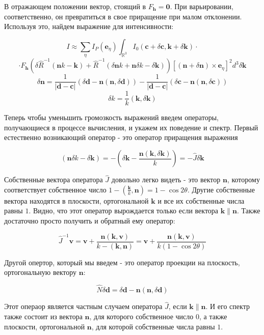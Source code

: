 \documentclass[12pt]{article}
\begin{document}
В отражающем положении вектор, стоящий в $F_{\pmb{h}} = \pmb{0}$. При варьировании,
соответственно, он превратиться в свое приращение при малом отклонении. Используя это,
найдем выражение для интенсивности:

\[ I \approx \sum_\eta I_P(\pmb{e}_\eta) \int_{\mathbb{R}^3}
I_0(\pmb{c} + \delta \pmb{c}, \pmb{k} + \delta \pmb{k}) \cdot\]
\[\cdot F_{\pmb{h}}\left(\delta \hat{R}^{-1} (\pmb{n} k - \pmb{k}) +
\hat{R}^{-1}(\delta \pmb{n} k + \pmb{n} \delta k - \delta \pmb{k})\right)
\left[(\pmb{n} + \delta \pmb{n}) \times \pmb{e}_\eta\right]^2 d^3 \delta \pmb{k}\]
\[ \delta \pmb{n} = \frac{1}{|\pmb{d} - \pmb{c}|}
(\delta \pmb{d} - \pmb{n} (\pmb{n}, \delta \pmb{d})) -
\frac{1}{|\pmb{d} - \pmb{c}|} (\delta \pmb{c} - \pmb{n} (\pmb{n}, \delta \pmb{c}))\]
\[ \delta k = \frac{1}{k}(\pmb{k}, \delta \pmb{k}) \]

Теперь чтобы уменьшить громозкость выражений введем операторы, получающиеся в
процессе вычисления, и укажем их поведение и спектр. Первый естественно
возникающий оператор - это оператор приращения выражения

\[ (\pmb{n} \delta k - \delta \pmb{k}) =
    - \left( \delta \pmb{k} - \frac{\pmb{n} (\pmb{k}, \delta \pmb{k})}{k} \right)
= -\hat{J} \delta \pmb{k} \]

Собственные вектора оператора $\hat{J}$ довольно легко видеть - это вектор
$\pmb{n}$, которому соответствует собственное число
$1 - \left(\frac{\pmb{k}}{k}, \pmb{n}\right) = 1 - \cos{2\theta}$.
Другие собственные вектора находятся в плоскости, ортогональной $\pmb{k}$ и
все их собственные числа равны $1$. Видно, что этот оператор вырождается
только если вектора $\pmb{k} \parallel \pmb{n}$. Также достаточно просто получить и
обратный ему оператор:

\[ \hat{J}^{-1} \pmb{v} = \pmb{v} + \frac{\pmb{n}(\pmb{k}, \pmb{v})}
{k - (\pmb{k}, \pmb{n})} = \pmb{v} + \frac{\pmb{n}(\pmb{k}, \pmb{v})}{k(1 - \cos{2\theta})}\]

Другой опертор, который мы введем - это оператор проекции на плоскость, ортогональную
вектору $\pmb{n}$:

\[ \hat{N} \delta \pmb{d} = \delta \pmb{d} - \pmb{n} (\pmb{n}, \delta \pmb{d})\]

Этот операор является частным случаем оператора $\hat{J}$, если $\pmb{k} \parallel \pmb{n}$.
И его спектр также состоит из вектора $\pmb{n}$, для которого собственное число $0$, а также
плоскости, ортогональной $\pmb{n}$, для которой собственные числа равны $1$.
\end{document}
